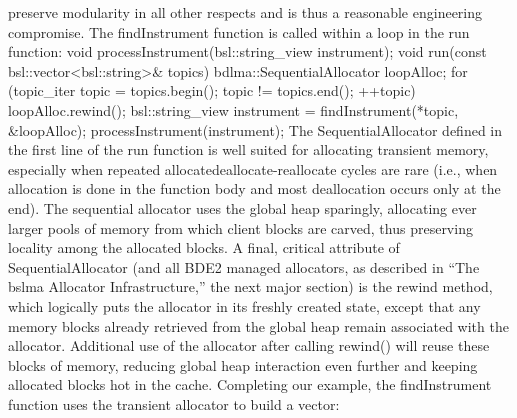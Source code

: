 preserve modularity in all other respects and is thus a reasonable engineering
compromise. The findInstrument function is called within a loop in the run
function:
void processInstrument(bsl::string_view instrument);
void run(const bsl::vector<bsl::string>& topics)
{
 bdlma::SequentialAllocator loopAlloc;
 for (topic_iter topic = topics.begin();
 topic != topics.end(); ++topic) {
 loopAlloc.rewind();
 bsl::string_view instrument = findInstrument(*topic, &loopAlloc);
 processInstrument(instrument);
 }
}
The SequentialAllocator defined in the first line of the run function is well
suited for allocating transient memory, especially when repeated allocatedeallocate-reallocate cycles are rare (i.e., when allocation is done in the
function body and most deallocation occurs only at the end). The sequential
allocator uses the global heap sparingly, allocating ever larger pools of memory
from which client blocks are carved, thus preserving locality among the
allocated blocks. A final, critical attribute of SequentialAllocator (and all
BDE2 managed allocators, as described in “The bslma Allocator Infrastructure,”
the next major section) is the rewind method, which logically puts the allocator
in its freshly created state, except that any memory blocks already retrieved
from the global heap remain associated with the allocator. Additional use of the
allocator after calling rewind() will reuse these blocks of memory, reducing
global heap interaction even further and keeping allocated blocks hot in the
cache.
Completing our example, the findInstrument function uses the transient
allocator to build a vector:

